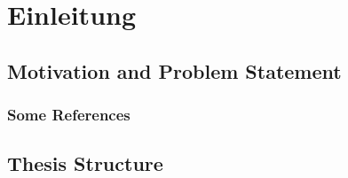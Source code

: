%
\chapter{Einleitung}
\label{sec:intro}


\section{Motivation and Problem Statement}
\label{sec:intro:motivation}



\subsection{Some References}
\label{sec:intro:results:refs}

\section{Thesis Structure}
\label{sec:intro:structure}
